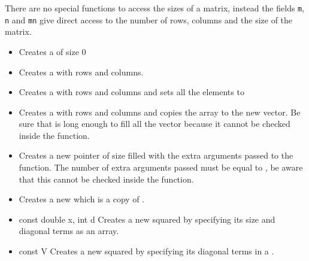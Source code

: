 There are no special functions to access the sizes of a matrix, instead the fields
\verb!m!, \verb!n! and \verb!mn! give direct access to the number of rows, columns
and the size of the matrix.

\begin{itemize}
  \item {}
  \sshortdescribe Creates a  of size 0

\item {}
  \sshortdescribe Creates a   with  rows and  columns.

\item {}
  \sshortdescribe Creates a  with  rows and 
  columns and sets all the elements to 

\item {}
  \sshortdescribe Creates a  with  rows and 
  columns and copies the array  to the new vector. Be sure that 
  is long enough to fill all the vector because it cannot be checked inside the function.

\item {}
  \sshortdescribe Creates a new  pointer of size  filled with the extra arguments passed to the function. The
  number of extra arguments passed must be equal to , be
  aware that this cannot be checked inside the function.

\item {}
  \sshortdescribe Creates a new  which is a copy of .
  
\item {}
  {const double \ptr x, int d}
  \sshortdescribe Creates a new squared  by specifying its size and
  diagonal terms as an array.

\item {}
  {const  \ptr V}
  \sshortdescribe Creates a new squared  by specifying its diagonal
  terms in a .


\end{itemize}
